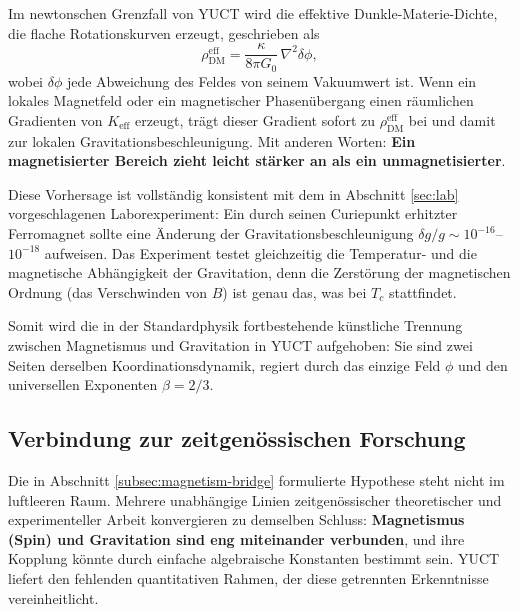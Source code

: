\documentclass[12pt]{article}
\theoremstyle{remark}
\newcommand{\Keff}{K_{\mathrm{eff}}}
\begin{document}
	Im newtonschen Grenzfall von YUCT wird die effektive Dunkle-Materie-Dichte, die flache Rotationskurven erzeugt, geschrieben als
	\begin{equation}
		\rho_{\mathrm{DM}}^{\mathrm{eff}} = \frac{\kappa}{8\pi G_0}\,\nabla^2\delta\phi,
		\label{eq:rho-dm}
	\end{equation}
	wobei $\delta\phi$ jede Abweichung des Feldes von seinem Vakuumwert ist.
	Wenn ein lokales Magnetfeld oder ein magnetischer Phasenübergang einen räumlichen Gradienten von $\Keff$ erzeugt, trägt dieser Gradient sofort zu $\rho_{\mathrm{DM}}^{\mathrm{eff}}$ bei und damit zur lokalen Gravitationsbeschleunigung. 
	Mit anderen Worten: \textbf{Ein magnetisierter Bereich zieht leicht stärker an als ein unmagnetisierter}.
	
	Diese Vorhersage ist vollständig konsistent mit dem in Abschnitt \ref{sec:lab} vorgeschlagenen Laborexperiment: Ein durch seinen Curiepunkt erhitzter Ferromagnet sollte eine Änderung der Gravitationsbeschleunigung $\delta g/g \sim 10^{-16}$–$10^{-18}$ aufweisen. Das Experiment testet gleichzeitig die Temperatur- und die magnetische Abhängigkeit der Gravitation, denn die Zerstörung der magnetischen Ordnung (das Verschwinden von $B$) ist genau das, was bei $T_c$ stattfindet.
	
	Somit wird die in der Standardphysik fortbestehende künstliche Trennung zwischen Magnetismus und Gravitation in YUCT aufgehoben: Sie sind zwei Seiten derselben Koordinationsdynamik, regiert durch das einzige Feld $\phi$ und den universellen Exponenten $\beta = 2/3$.
	
	\subsection{Verbindung zur zeitgenössischen Forschung}
	\label{subsec:mainstream}
	
	Die in Abschnitt \ref{subsec:magnetism-bridge} formulierte Hypothese steht nicht im luftleeren Raum.
	Mehrere unabhängige Linien zeitgenössischer theoretischer und experimenteller Arbeit
	konvergieren zu demselben Schluss: \textbf{Magnetismus (Spin) und Gravitation sind
		eng miteinander verbunden}, und ihre Kopplung könnte durch einfache
	algebraische Konstanten bestimmt sein.  YUCT liefert den fehlenden quantitativen Rahmen,
	der diese getrennten Erkenntnisse vereinheitlicht.
	
\end{document}
